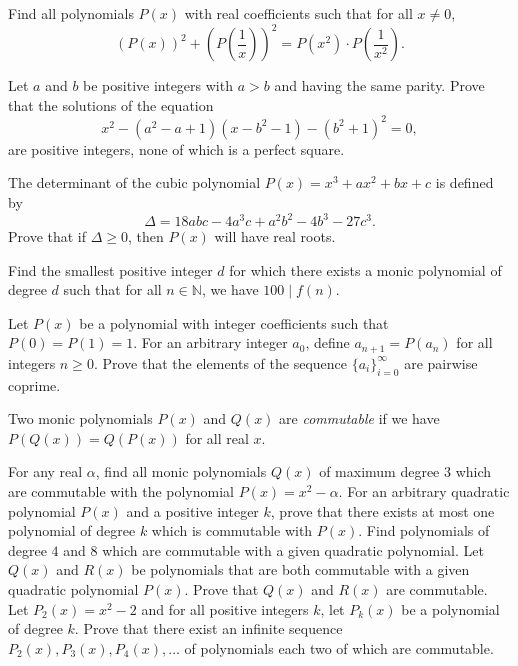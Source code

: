 \begin{question}[name={1995 Austrian--Polish}]
    Find all polynomials $P(x)$ with real coefficients such that for all $x\neq 0$,
    \[(P(x))^2 + \left(P\left(\frac{1}{x}\right)\right)^2 = P(x^2) \cdot P\left(\frac{1}{x^2}\right).\]
\end{question}


\begin{question}[name={1995 Balkan}]
    Let $a$ and $b$ be positive integers with $a > b$ and having the same parity. Prove that the solutions of the equation \[ x^2 - (a^2 - a + 1)(x - b^2 - 1) - (b^2 + 1)^2 = 0, \] are positive integers, none of which is a perfect square.
\end{question}



\begin{question}[name={1998 Iran}]
    The determinant of the cubic polynomial $P(x)=x^3+ax^2+bx+c$ is defined by \[\Delta = 18abc - 4a^3c + a^2b^2 -4b^3 - 27c^3.\]
    Prove that if $\Delta \geq 0$, then $P(x)$ will have real roots.
\end{question}


\begin{question}[name={1998 Iran}]
    Find the smallest positive integer $d$ for which there exists a monic polynomial of degree $d$ such that for all $n\in\mathbb N$, we have $100 \mid f(n)$.
\end{question}

\begin{question}
    Let $P(x)$ be a polynomial with integer coefficients such that $P(0)=P(1)=1$. For an arbitrary integer $a_0$, define $a_{n+1} = P(a_n)$ for all integers $n \geq 0$. Prove that the elements of the sequence $\{a_i\}_{i=0}^\infty$ are pairwise coprime.
\end{question}

\begin{question}[name={1977 USSR}]
    Two monic polynomials $P(x)$ and $Q(x)$ are \textit{commutable} if we have $P(Q(x))=Q(P(x))$ for all real $x$. 
    \begin{tasks}
        \task For any real $\alpha$, find all monic polynomials $Q(x)$ of maximum degree $3$ which are commutable with the polynomial $P(x)=x^2-\alpha$.
        \task For an arbitrary quadratic polynomial $P(x)$ and a positive integer $k$, prove that there exists at most one polynomial of degree $k$ which is commutable with $P(x)$.
        \task Find polynomials of degree $4$ and $8$ which are commutable with a given quadratic polynomial.
        \task Let $Q(x)$ and $R(x)$ be polynomials that are both commutable with a given quadratic polynomial $P(x)$. Prove that $Q(x)$ and $R(x)$ are commutable.
        \task Let $P_2(x)=x^2-2$ and for all positive integers $k$, let $P_k(x)$ be a polynomial of degree $k$. Prove that there exist an infinite sequence $P_2(x), P_3(x), P_4(x),\dots$ of polynomials each two of which are commutable.
    \end{tasks}
\end{question}


